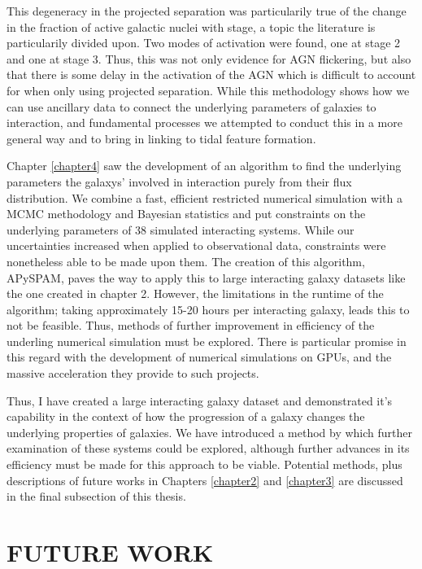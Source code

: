 This degeneracy in the projected separation was particularily true of the change in the fraction of active galactic nuclei with stage, a topic the literature is particularily divided upon. Two modes of activation were found, one at stage 2 and one at stage 3. Thus, this was not only evidence for AGN flickering, but also that there is some delay in the activation of the AGN which is difficult to account for when only using projected separation. While this methodology shows how we can use ancillary data to connect the underlying parameters of galaxies to interaction, and fundamental processes we attempted to conduct this in a more general way and to bring in linking to tidal feature formation. 

Chapter \ref{chapter4} saw the development of an algorithm to find the underlying parameters the galaxys' involved in interaction purely from their flux distribution. We combine a fast, efficient restricted numerical simulation with a MCMC methodology and Bayesian statistics and put constraints on the underlying parameters of 38 simulated interacting systems. While our uncertainties increased when applied to observational data, constraints were nonetheless able to be made upon them. The creation of this algorithm, APySPAM, paves the way to apply this to large interacting galaxy datasets like the one created in chapter 2. However, the limitations in the runtime of the algorithm; taking approximately 15-20 hours per interacting galaxy, leads this to not be feasible. Thus, methods of further improvement in efficiency of the underling numerical simulation must be explored. There is particular promise in this regard with the development of numerical simulations on GPUs, and the massive acceleration they provide to such projects.

Thus, I have created a large interacting galaxy dataset and demonstrated it's capability in the context of how the progression of a galaxy changes the underlying properties of galaxies. We have introduced a method by which further examination of these systems could be explored, although further advances in its efficiency must be made for this approach to be viable. Potential methods, plus descriptions of future works in Chapters \ref{chapter2} and \ref{chapter3} are discussed in the final subsection of this thesis.

\section{FUTURE WORK}
